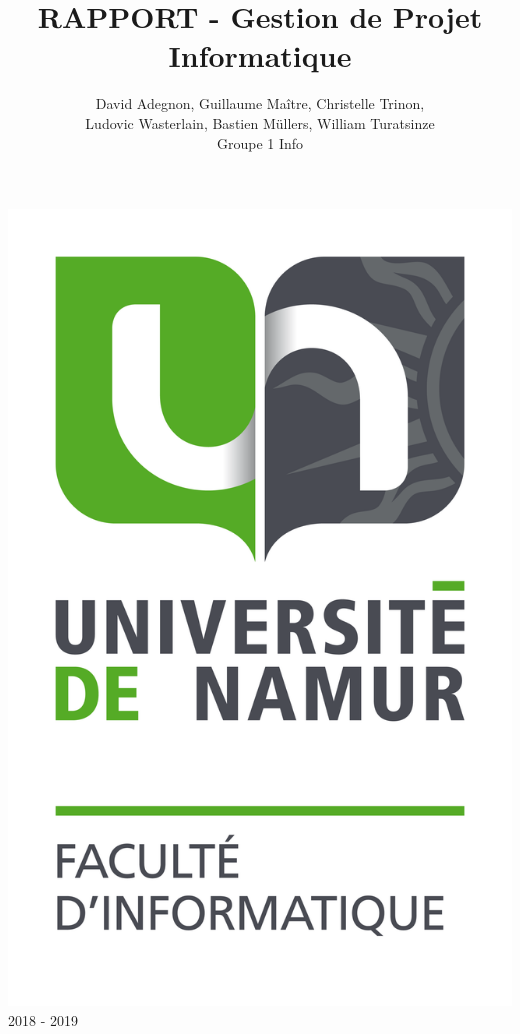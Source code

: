 \documentclass[t, 12pt, usenames,dvipsnames]{article}
\title{RAPPORT - Gestion de Projet Informatique}
\author{David Adegnon, Guillaume Maître, Christelle Trinon,\\Ludovic Wasterlain, Bastien Müllers, William Turatsinze\\Groupe 1 Info}
\begin{document}
    \begin{titlepage}
        \maketitle
        
        \begin{center}
            \includegraphics[scale=0.5]{images/FAC_info.png} \\
            2018 - 2019
        \end{center}
    
    \end{titlepage}

    
\end{document}

